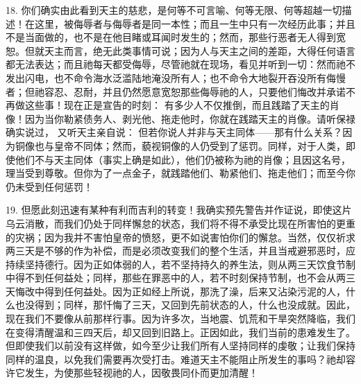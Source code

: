 18. 你们确实由此看到天主的慈悲，是何等不可言喻、何等无限、何等超越一切描述！在这里，被侮辱者与侮辱者是同一本性；而且一生中只有一次经历此事；并且不是当面做的，也不是在他目睹或耳闻时发生的；然而，那些行恶者无人得到宽恕。但就天主而言，绝无此类事情可说；因为人与天主之间的差距，大得任何语言都无法表达；而且祂每天都受侮辱，尽管祂就在现场，看见并听到一切：然而祂不发出闪电，也不命令海水泛滥陆地淹没所有人；也不命令大地裂开吞没所有侮慢者；但祂容忍、忍耐，并且仍然愿意宽恕那些侮辱祂的人，只要他们悔改并承诺不再做这些事！现在正是宣告的时刻： 有多少人不仅推倒，而且践踏了天主的肖像！因为当你勒紧债务人、剥光他、拖走他时，你就在践踏天主的肖像。请听保禄确实说过， 又听天主亲自说： 但若你说人并非与天主同体——那有什么关系？因为铜像也与皇帝不同体；然而，藐视铜像的人仍受到了惩罚。同样，对于人类，即使他们不与天主同体（事实上确是如此），他们仍被称为祂的肖像；且因这名号，理当受到尊敬。但你为了一点金子，就践踏他们、勒紧他们、拖走他们；而至今你仍未受到任何惩罚！\par

19. 但愿此刻迅速有某种有利而吉利的转变！我确实预先警告并作证说，即使这片乌云消散，而我们仍处于同样懈怠的状态，我们将不得不承受比现在所害怕的更重的灾祸；因为我并不害怕皇帝的愤怒，更不如说害怕你们的懈怠。当然，仅仅祈求两三天是不够的作为补偿，而是必须改变我们的整个生活，并且当戒避邪恶时，应持续坚持德行。因为正如体弱的人，若不坚持持久的养生法，则从两三天饮食节制中得不到任何益处；同样，那些在罪恶中的人，若不时刻保持节制，也不会从两三天悔改中得到任何益处。因为正如经上所说，那洗了澡，后来又沾染污泥的人，什么也没得到；同样，那忏悔了三天，又回到先前状态的人，什么也没成就。因此，现在我们不要像从前那样行事。因为许多次，当地震、饥荒和干旱突然降临，我们在变得清醒温和三四天后，却又回到旧路上。正因如此，我们当前的患难发生了。但即使我们以前没有这样做，如今至少让我们所有人坚持同样的虔敬；让我们保持同样的温良，以免我们需要再次受打击。难道天主不能阻止所发生的事吗？祂却容许它发生，为使那些轻视祂的人，因敬畏同仆而更加清醒！\par


